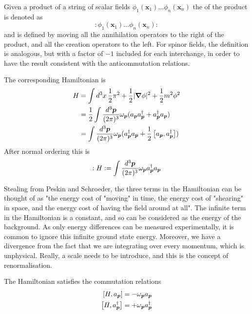 \documentclass{article}
\begin{document}
\begin{definition}
Given a product of a string of scalar fields $\phi_1(\bm{x}_1)\dots\phi_n(\bm{x}_n)$ the  of the product is denoted as 
\[
:\phi_1(\bm{x}_1)\dots\phi_n(\bm{x}_n):
\]
and is defined by moving all the annihilation operators to the right of the product, and all the creation operators to the left. For spinor fields, the definition is analogous, but with a factor of $-1$ included for each interchange, in order to have the result consistent with the anticommutation relations. 
\end{definition}

\begin{theorem}
The corresponding Hamiltonian is 
\begin{align*}
    H &= \int d^3x \, \frac{1}{2}\pi^2+\frac{1}{2}|\grad\phi|^2+\frac{1}{2}m^2\phi^2 \\
    &= \frac{1}{2} \int \tmeas \omega_{\bm{p}} (a_{\bm{p}}a_{\bm{p}}^\dagger+a_{\bm{p}}^\dagger a_{\bm{p}}) \\
    &= \int \tmeas \omega_{\bm{p}} ( a_{\bm{p}}^\dagger a_{\bm{p}} +\frac{1}{2}\comm[a_{\bm{p}}]{a_{\bm{p}}^\dagger})
\end{align*}
After normal ordering this is 
\[
:H:=\int\tmeas \omega_{\bm{p}} a_{\bm{p}}^\dagger a_{\bm{p}}
\]
\end{theorem}

\begin{idea}
Stealing from Peskin and Schroeder, the three terms in the Hamiltonian can be thought of as "the energy cost of "moving" in time, the energy cost of "shearing" in space, and the energy cost of having the field around at all". The infinite term in the Hamiltonian is a constant, and so can be considered as the energy of the background. As only energy differences can be measured experimentally, it is common to ignore this infinite ground state energy. Moreover, we have a divergence from the fact that we are integrating over every momentum, which is unphysical. Really, a scale needs to be introduce, and this is the concept of renormalisation. 
\end{idea}

\begin{theorem}
The Hamiltonian satisfies the commutation relations
\begin{align*}
    \comm[H]{a_{\bm{p}}} &= -\omega_{\bm{p}} a_{\bm{p}} \\ 
    \comm[H]{a_{\bm{p}}^\dagger} &= +\omega_{\bm{p}} a_{\bm{p}}^\dagger
\end{align*}
\end{theorem}
\end{document}
